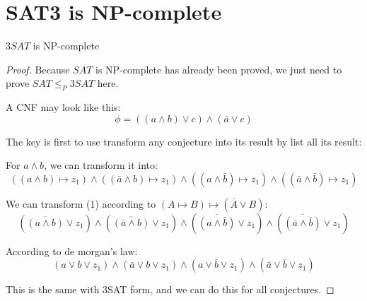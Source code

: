 \section{SAT3 is NP-complete}
\begin{theorem}
    \(3SAT\) is NP-complete 
\end{theorem}
\begin{proof}
    Because \(SAT\) is NP-complete has already been proved, we just need to prove \(SAT \leq_P 3SAT\) here. 

    A CNF may look like this:
    \[
        \phi = ((a \land b) \lor c) \land (\bar{a} \lor c)
    \]

    The key is first to use transform any conjecture into its result by list all its result:
    
    For \(a \land b\), we can transform it into:
    \[
        ((a \land b) \mapsto z_1) \land 
        ((\bar{a} \land b) \mapsto z_1) \land 
        ((a \land \bar{b}) \mapsto z_1) \land 
        ((\bar{a} \land \bar{b}) \mapsto z_1) \tag{1}
    \] 

    We can transform (1) according to \((A \mapsto B) \mapsto (\bar{A} \lor B)\):
    \[
        (\overline{(a \land b)} \lor z_1) \land 
        (\overline{(\bar{a} \land b)} \lor z_1) \land 
        (\overline{(a \land \bar{b})} \lor z_1) \land 
        (\overline{(\bar{a} \land \bar{b})} \lor z_1) \tag{2}
    \]  

    According to de morgan's law:
    \[
        (a \lor b \lor z_1) \land
        (\bar{a} \lor b \lor z_1) \land
        (a \lor \bar{b} \lor z_1) \land
        (\bar{a} \lor \bar{b} \lor z_1) 
    \]

    This is the same with 3SAT form, and we can do this for all conjectures.
\end{proof}
